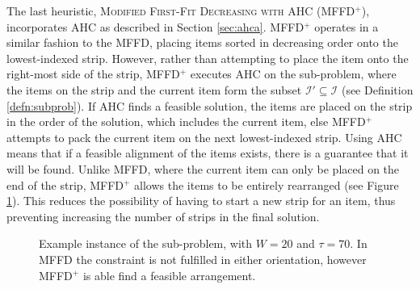 \documentclass[oribibl]{llncs}
\begin{document}
The last heuristic, \textsc{Modified First-Fit Decreasing with AHC} (MFFD$^+$), incorporates AHC as described in Section \ref{sec:ahca}. MFFD$^+$ operates in a similar fashion to the MFFD, placing items sorted in decreasing order onto the lowest-indexed strip. However, rather than attempting to place the item onto the right-most side of the strip, MFFD$^+$ executes AHC on the sub-problem, where the items on the strip and the current item form the subset $\mathcal{I}' \subseteq \mathcal{I}$ (see Definition \ref{defn:subprob}). If AHC finds a feasible solution, the items are placed on the strip in the order of the solution, which includes the current item, else MFFD$^+$ attempts to pack the current item on the next lowest-indexed strip. Using AHC means that if a feasible alignment of the items exists, there is a guarantee that it will be found. Unlike MFFD, where the current item can only be placed on the end of the strip, MFFD$^+$ allows the items to be entirely rearranged (see Figure \ref{fig:comparestrips}). This reduces the possibility of having to start a new strip for an item, thus preventing increasing the number of strips in the final solution. 

\begin{figure}[h!]	
	\centering
	
	\caption{Example instance of the sub-problem, with $W = 20$ and $\tau = 70$. In MFFD the constraint is not fulfilled in either orientation, however MFFD$^+$ is able find a feasible arrangement.}	
	\label{fig:comparestrips}
\end{figure}
\end{document}
